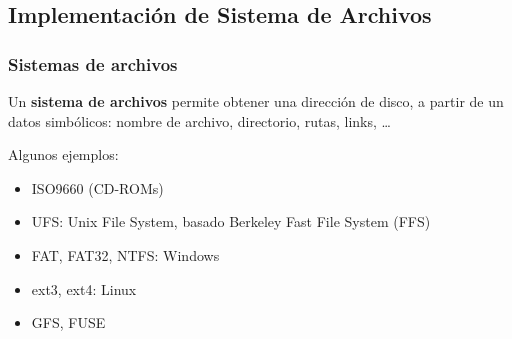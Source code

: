 \documentclass[letter]{beamer}
\begin{document}
\subsection{Implementación de Sistema de Archivos}

\begin{frame}
  \frametitle{Sistemas de archivos}

  Un {\bf sistema de archivos} permite obtener una dirección de disco,
  a partir de un datos simbólicos: nombre de archivo, directorio, rutas, links, \ldots
  
  Algunos ejemplos:
  \begin{itemize}
    \item ISO9660 (CD-ROMs)
    \item UFS: Unix File System, basado Berkeley Fast File System (FFS)
    \item FAT, FAT32, NTFS: Windows
    \item ext3, ext4: Linux
    \item GFS, FUSE
  \end{itemize}

\end{frame}
\end{document}
